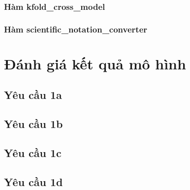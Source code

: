 \documentclass[]{article}
\begin{document}
\subsubsection{Hàm kfold\_cross\_model}
\subsubsection{Hàm scientific\_notation\_converter}

\section{Đánh giá kết quả mô hình}
\subsection{Yêu cầu 1a}

\subsection{Yêu cầu 1b}

\subsection{Yêu cầu 1c}

\subsection{Yêu cầu 1d}

\newpage
\printbibliography[heading=mybibintoc]
\end{document}
